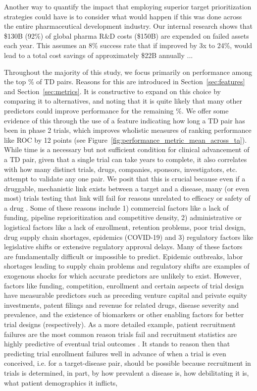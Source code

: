 \documentclass{article}
\begin{document}
Another way to quantify the impact that employing superior target prioritization strategies could have is to consider what would happen if this was done across the entire pharmaceutical development industry. Our internal research shows that \$130B (92\%) of global pharma R\&D costs (\$150B) are expended on failed assets each year. This assumes an 8\% success rate that if improved by 3x to 24\%, would lead to a total cost savings of approximately \$22B annually ...

Throughout the majority of this study, we focus primarily on performance among the top \topRankingPct\% of TD pairs. Reasons for this are introduced in Section~\ref{sec:features} and Section~\ref{sec:metrics}. It is constructive to expand on this choice by comparing it to alternatives, and noting that it is quite likely that many other predictors could improve performance for the remaining \bottomRankingPct\%. We offer some evidence of this through the use of a feature indicating how long a TD pair has been in phase 2 trials, which improves wholistic measures of ranking performance like ROC by 12 points (see Figure~\ref{fig:performance_metric_mean_across_ta}). While time is a necessary but not sufficient condition for clinical advancement of a TD pair, given that a single trial can take years to complete, it also correlates with how many distinct trials, drugs, companies, sponsors, investigators, etc. attempt to validate any one pair. We posit that this is crucial because even if a druggable, mechanistic link exists between a target and a disease, many (or even most) trials testing that link will fail for reasons unrelated to efficacy or safety of a drug \cite{Razuvayevskaya2023.02.07.23285407}. Some of these reasons include 1) commercial factors like a lack of funding, pipeline reprioritization and competitive density, 2) administrative or logistical factors like a lack of enrollment, retention problems, poor trial design, drug supply chain shortages, epidemics (COVID-19) and 3) regulatory factors like legislative shifts or extensive regulatory approval delays. Many of these factors are fundamentally difficult or impossible to predict. Epidemic outbreaks, labor shortages leading to supply chain problems and regulatory shifts are examples of exogenous shocks for which accurate predictors are unlikely to exist. However, factors like funding, competition, enrollment and certain aspects of trial design have measurable predictors such as preceding venture capital and private equity investments, patent filings and revenue for related drugs, disease severity and prevalence, and the existence of biomarkers or other enabling factors for better trial designs (respectively). As a more detailed example, patient recruitment failures are the most common reason trials fail \cite{Razuvayevskaya2023.02.07.23285407} and recruitment statistics are highly predictive of eventual trial outcomes \cite{Lo2019Machine,PMID:34430930}. It stands to reason then that predicting trial enrollment failures well in advance of when a trial is even conceived, i.e. for a target-disease pair, should be possible because recruitment in trials is determined, in part, by how prevalent a disease is, how debilitating it is, what patient demographics it inflicts, 
\end{document}
